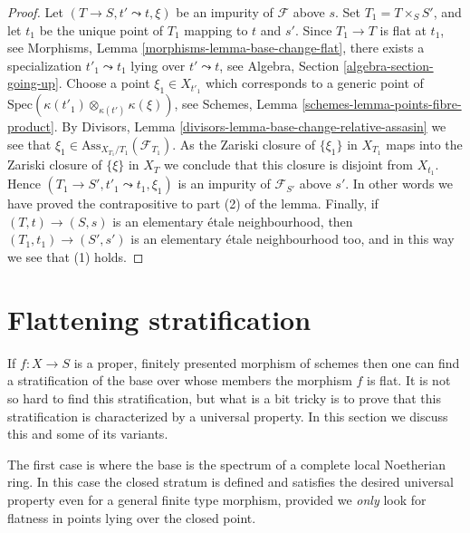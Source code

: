 \begin{proof}
Let $(T \to S, t' \leadsto t, \xi)$ be an impurity of
$\mathcal{F}$ above $s$. Set $T_1 = T \times_S S'$, and let $t_1$
be the unique point of $T_1$ mapping to $t$ and $s'$. Since
$T_1 \to T$ is flat at $t_1$, see
Morphisms, Lemma \ref{morphisms-lemma-base-change-flat},
there exists a specialization $t'_1 \leadsto t_1$ lying over
$t' \leadsto t$, see
Algebra, Section \ref{algebra-section-going-up}.
Choose a point $\xi_1 \in X_{t'_1}$ which corresponds to a generic
point of $\text{Spec}(\kappa(t'_1) \otimes_{\kappa(t')} \kappa(\xi))$, see
Schemes, Lemma \ref{schemes-lemma-points-fibre-product}.
By
Divisors, Lemma \ref{divisors-lemma-base-change-relative-assasin}
we see that $\xi_1 \in \text{Ass}_{X_{T_1}/T_1}(\mathcal{F}_{T_1})$.
As the Zariski closure of $\{\xi_1\}$ in $X_{T_1}$ maps into the
Zariski closure of $\{\xi\}$ in $X_T$ we conclude that
this closure is disjoint from $X_{t_1}$. Hence
$(T_1 \to S', t'_1 \leadsto t_1, \xi_1)$
is an impurity of $\mathcal{F}_{S'}$ above $s'$.
In other words we have proved the contrapositive to part (2) of the
lemma. Finally, if $(T, t) \to (S, s)$ is an elementary
\'etale neighbourhood, then $(T_1, t_1) \to (S', s')$ is an
elementary \'etale neighbourhood too, and in this way we see that (1) holds.
\end{proof}




\section{Flattening stratification}
\label{section-flattening}

\noindent
If $f : X \to S$ is a proper, finitely presented morphism
of schemes then one can find a stratification of the base
over whose members the morphism $f$ is flat. It is not so hard
to find this stratification, but what is a bit tricky is to prove
that this stratification is characterized by a universal property.
In this section we discuss this and some of its variants.

\medskip\noindent
The first case is where the base is the spectrum of a complete
local Noetherian ring. In this case the closed stratum is defined
and satisfies the desired universal property even for a general
finite type morphism, provided we {\it only} look for flatness in
points lying over the closed point.

